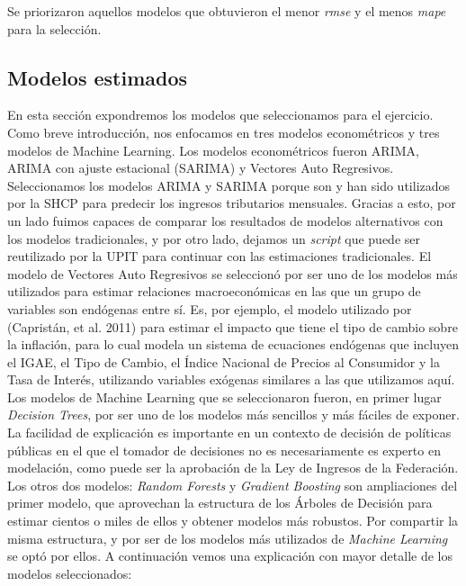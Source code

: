 \documentclass[a4paper, 11pt]{article}
\begin{document}
Se priorizaron aquellos modelos que obtuvieron el menor \textit{rmse} y el menos \textit{mape} para la selección.
\subsection*{Modelos estimados}
En esta sección expondremos los modelos que seleccionamos para el ejercicio. Como breve introducción, nos enfocamos en tres modelos econométricos y tres modelos de Machine Learning. Los modelos econométricos fueron ARIMA, ARIMA con ajuste estacional (SARIMA) y Vectores Auto Regresivos. Seleccionamos los modelos  ARIMA y SARIMA porque son y han sido utilizados por la SHCP para predecir los ingresos tributarios mensuales. Gracias a esto, por un lado fuimos capaces de comparar los resultados de modelos alternativos con los modelos tradicionales, y por otro lado, dejamos un \textit{script} que puede ser reutilizado por la UPIT para continuar con las estimaciones tradicionales. El modelo de Vectores Auto Regresivos se seleccionó por ser uno de los modelos más utilizados para estimar relaciones macroeconómicas en las que un grupo de variables son endógenas entre sí. Es, por ejemplo, el modelo utilizado por (Capristán, et al. 2011) para estimar el impacto que tiene el tipo de cambio sobre la inflación, para lo cual modela un sistema de ecuaciones endógenas que incluyen el IGAE, el Tipo de Cambio, el Índice Nacional de Precios al Consumidor y la Tasa de Interés, utilizando variables exógenas similares a las que utilizamos aquí. \\

Los modelos de Machine Learning que se seleccionaron fueron, en primer lugar \textit{Decision Trees}, por ser uno de los modelos más sencillos y más fáciles de exponer. La facilidad de explicación es importante en un contexto de decisión de políticas públicas en el que el tomador de decisiones no es necesariamente es experto en modelación, como puede ser la aprobación de la Ley de Ingresos de la Federación. Los otros dos modelos: \textit{Random Forests} y \textit{Gradient Boosting} son ampliaciones del primer modelo, que aprovechan la estructura de los Árboles de Decisión para estimar cientos o miles de ellos y obtener modelos más robustos. Por compartir la misma estructura, y por ser de los modelos más utilizados de \textit{Machine Learning}  se optó por ellos. A continuación vemos una explicación con mayor detalle de los modelos seleccionados:
\end{document}
